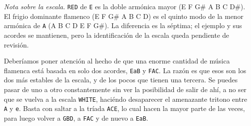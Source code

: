 \documentclass[]{report}
\begin{document}
\emph{Nota sobre la escala.} \texttt{RED} de \texttt{E} es la doble armónica
mayor (E F G\# A B C D\#). El frigio dominante flamenco (E F G\# A B C D) es el
quinto modo de la menor armónica de \texttt{A} (A B C D E F G\#). La diferencia
es la séptima; el ejemplo y sus acordes se mantienen, pero la identificación de
la escala queda pendiente de revisión.

Deberíamos poner atención al hecho de que una enorme cantidad de música flamenca está basada en solo dos acordes, \texttt{EaB} y \texttt{FAC}. La razón es que esos son los dos más estables de la escala, y de los pocos que tienen una tercera. Se puedes pasar de uno a otro constantemente sin ver la posibilidad de salir de ahí, a no ser que se vuelva a la escala \texttt{WHITE}, haciéndo desaparecer el amenazante tritono entre \texttt{A} y \texttt{e}. Basta con saltar a la tríada \texttt{ACE}, lo cual hacen la mayor parte de las veces, para luego volver a \texttt{GBD}, a \texttt{FAC} y de nuevo a \texttt{EaB}.
\end{document}
